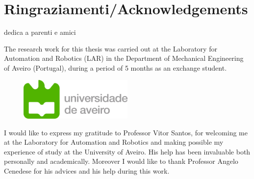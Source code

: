 \chapter*{Ringraziamenti/Acknowledgements}
\thispagestyle{empty}
dedica a parenti e amici

The research work for this thesis was carried out at the Laboratory for Automation and Robotics (LAR) in the Department of Mechanical Engineering of Aveiro (Portugal), during a period of 5 months as an exchange student.
\begin{figure}[!h]
	\centering
	\includegraphics[width=0.50\textwidth]{../figure/logo_ua.png}
	\label{fig:logo_ua}
\end{figure}

I would like to express my gratitude to Professor Vitor Santos, for welcoming me at the Laboratory for Automation and Robotics and making possible my experience of study at the University of Aveiro. His help has been invaluable both personally and academically. Moreover I would like to thank Professor Angelo Cenedese for his advices and his help during this work.

